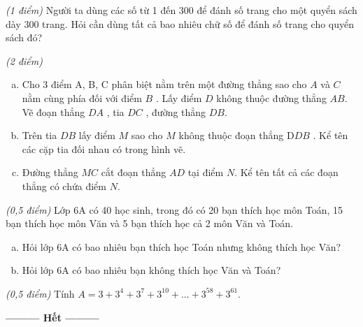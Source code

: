 \begin{ex}
\begin{enumerate}[a)]
\end{enumerate}
\end{ex}     \begin{ex} \textit{(1 điểm)} Người ta dùng các số từ 1 đến 300 để đánh số trang cho một quyển sách dày 300 trang. Hỏi cần dùng tất cả bao nhiêu chữ số để đánh số trang cho quyển sách đó?\\
\end{ex}     \begin{ex} \textit{(2 điểm)} 
 \begin{enumerate}[a)]
\item Cho 3 điểm A, B, C phân biệt nằm trên một đường thẳng sao cho  $A$ và $C$  nằm cùng phía đối với điểm $B$ . Lấy điểm $D$  không thuộc đường thẳng $AB$. Vẽ đoạn thẳng $DA$ , tia $DC$ , đường thẳng $DB$.
\item Trên tia $DB$ lấy điểm $M$ sao cho $M$ không thuộc đoạn thẳng D$DB$ . Kể tên các cặp tia đối nhau có trong hình vẽ.
\item Đường thẳng $MC$ cắt đoạn thẳng $AD$ tại điểm $N$. Kể tên tất cả các đoạn thẳng có chứa điểm $N$.
\end{enumerate}
\end{ex}     \begin{ex}\textit{(0,5 điểm)} Lớp 6A có 40 học sinh, trong đó có 20 bạn thích học môn Toán, 15 bạn thích học môn Văn và 5 bạn thích học cả 2 môn Văn và Toán.
 \begin{enumerate}[a)]
\item Hỏi lớp 6A có bao nhiêu bạn thích học Toán nhưng không thích học Văn?
\item Hỏi lớp 6A có bao nhiêu bạn không thích học Văn và Toán?
\end{enumerate}
\end{ex}     \begin{ex}\textit{(0,5 điểm)} Tính $A = 3 + {3^4} + {3^7} + {3^{10}} + ... + {3^{58}} + {3^{61}}$.

\end{ex}
\begin{center}
\textbf{\textbf{---------} Hết \textbf{---------}}
\end{center}
